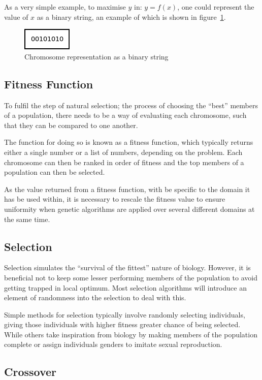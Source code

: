 \documentclass[10pt, a4paper]{article}
\begin{document}
As a very simple example, to maximise $y$ in: $y = f(x)$, one could represent 
the value of $x$ as a binary string, an example of which is shown in 
figure~\ref{fig:chromosome}.

\begin{figure}[h]
\centering
\includegraphics[scale=0.6]{img/chromosome.png}
\caption{Chromosome representation as a binary string}\label{fig:chromosome}
\end{figure}

\subsection{Fitness Function}
To fulfil the step of natural selection; the process of choosing the ``best''
members of a population, there needs to be a way of evaluating each chromosome,
such that they can be compared to one another.

The function for doing so is known as a fitness function, which typically 
returns either a single number or a list of numbers, depending on the problem.
Each chromosome can then be ranked in order of fitness and the top members of
a population can then be selected.

As the value returned from a fitness function, with be specific to the domain 
it has be used within, it is necessary to rescale the fitness value to ensure 
uniformity when genetic algorithms are applied over several different domains
at the same time.


\subsection{Selection}
Selection simulates the ``survival of the fittest'' nature of biology. However,
it is beneficial not to keep some lesser performing members of the population
to avoid getting trapped in local optimum. Most selection algorithms will 
introduce an element of randomness into the selection to deal with this.

Simple methods for selection typically involve randomly selecting individuals,
giving those individuals with higher fitness greater chance of being selected.
While others take inspiration from biology by making members of the population
complete or assign individuals genders to imitate sexual reproduction.

\subsection{Crossover}
\end{document}
